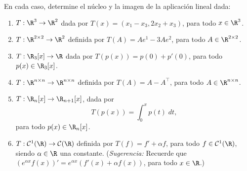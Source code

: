 \documentclass[a4,11pt]{aleph-notas}
\begin{document}
\begin{ejer}
    En cada caso, determine el núcleo y la imagen de la aplicación lineal dada:
    \begin{enumerate}
        \item $T:\R^3\to\R^2$ dada por $T(x) = (x_1-x_3,2x_2+x_3)$, para todo $x\in\R^3$.
        \item $T:\R^{2\times 2} \to \R^2$ definida por $T(A)=Ae^{1} - 3Ae^2$, para todo $A\in\R^{2\times 2}$.
        \item $T:\R_3[x]\to \R$ dada por $T(p(x))=p(0) + p'(0)$, para todo $p(x)\in\R_3[x]$.
        \item $T:\R^{n\times n}\to \R^{n\times n}$ definida por $T(A)=A-A^\intercal$, para todo $A\in\R^{n\times n}$.
        \item $T:\R_n[x]\to \R_{n+1}[x]$, dada por
        \[
            T(p(x)) = \int_0^x p(t)\; dt,
        \]
        para todo $p(x)\in \R_n[x]$.
        \item $T:\mathcal{C}^1(\R)\to\mathcal{C}(\R)$ definida por $T(f)=f' + \alpha f$, para todo $f\in\mathcal{C}^1(\R)$, siendo $\alpha\in \R$ una constante. (\emph{Sugerencia:} Recuerde que $(e^{\alpha x}f(x))' = e^{\alpha x}(f'(x) + \alpha f(x))$, para todo $x\in\R$.)
    \end{enumerate}
\end{ejer}
\end{document}
